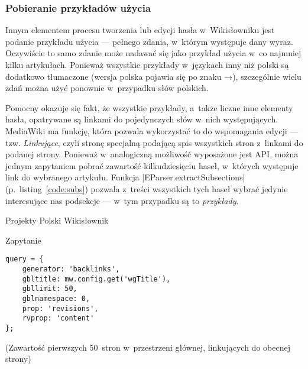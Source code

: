 
\subsubsection{Pobieranie przykładów użycia}
Innym elementem procesu tworzenia lub edycji hasła w~Wikisłowniku jest podanie przykładu użycia --- pełnego zdania, w~którym występuje dany wyraz. Oczywiście to samo zdanie może nadawać się jako przykład użycia w~co najmniej kilku artykułach. Ponieważ wszystkie przykłady w~językach inny niż polski są dodatkowo tłumaczone (wersja polska pojawia się po znaku →), szczególnie wielu zdań można użyć ponownie w~przypadku słów polskich.

Pomocny okazuje się fakt, że wszystkie przykłady, a~także liczne inne elementy hasła, opatrywane są linkami do pojedynczych słów w~nich występujących. MediaWiki ma funkcję, która pozwala wykorzystać to do wspomagania edycji --- tzw. \emph{Linkujące}, czyli stronę specjalną podającą spis wszystkich stron z~linkami do podanej strony. Ponieważ w~analogiczną możliwość wyposażone jest API, można jednym zapytaniem pobrać zawartość kilkudziesięciu haseł, w~których występuje link do wybranego artykułu. Funkcja \kod|EParser.extractSubsections| (p.~listing~\ref{code:subs}) pozwala z~treści wszystkich tych haseł wybrać jedynie interesujące nas podsekcje --- w~tym przypadku są to \emph{przykłady}.

\begin{opis}
\item[Projekty] Polski Wikisłownik
\item[Zapytanie]
\begin{verbatim}
query = {
    generator: 'backlinks',
    gbltitle: mw.config.get('wgTitle'),
    gbllimit: 50,
    gblnamespace: 0,
    prop: 'revisions',
    rvprop: 'content'
};
\end{verbatim}
(Zawartość pierwszych 50~stron w~przestrzeni głównej, linkujących do obecnej strony)
\end{opis}

